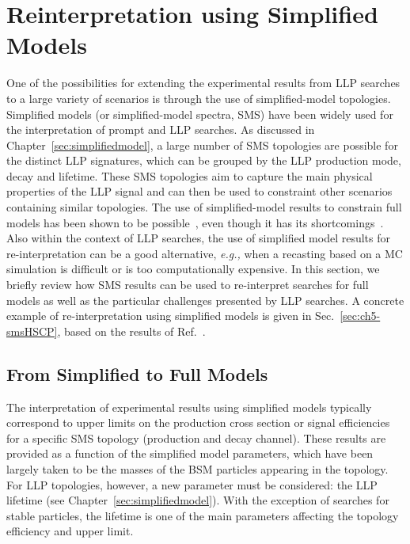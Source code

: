 \section{Reinterpretation using Simplified Models}
\label{sec:ch5-smsReinterpretations}

One of the possibilities for extending the experimental results from LLP
searches to a large variety of scenarios is through the use of simplified-model topologies.
Simplified models (or simplified-model spectra, SMS) have been widely used for the interpretation of
prompt and LLP searches. As discussed in Chapter~\ref{sec:simplifiedmodel}, a large
number of SMS topologies are possible for the distinct LLP signatures, which
can be grouped by the LLP production mode, decay and lifetime.
These SMS topologies aim to capture the main physical properties of the LLP
signal and can then be used to constraint other scenarios containing similar
topologies.
The use of simplified-model results to constrain full models has been
shown to be possible~\cite{Kraml:2013mwa,Papucci:2014rja,Belanger:2015cra,Barducci:2015zna,Arina:2015uea,Ambrogi:2017lov}, 
even though it has its shortcomings~\cite{Ambrogi:2017lov}.
Also within the context of LLP searches, the use of
simplified model results for re-interpretation can be a good alternative, \emph{e.g.,}
when a recasting based on a MC simulation is difficult or
is too computationally  expensive.
In this section, we briefly review how 
SMS results can be used to re-interpret searches for full
models as well as the particular challenges presented by LLP searches.
A concrete example of re-interpretation using simplified models is given in
Sec.~\ref{sec:ch5-smsHSCP}, based on the results of Ref.~\cite{Heisig:2015yla}.

\subsection{From Simplified to Full Models}

The interpretation of experimental results using
simplified models typically correspond to upper limits on the production
cross section or signal efficiencies for a specific SMS topology (production and
decay channel). These results are provided as a function of the simplified model
parameters, which have been largely taken to be the masses of the BSM
particles appearing in the topology. For LLP topologies, however, 
a new parameter must be considered: the LLP lifetime (see Chapter~\ref{sec:simplifiedmodel}).
With the exception of searches for stable particles, the lifetime is one of the
main parameters affecting the topology efficiency and upper limit.

